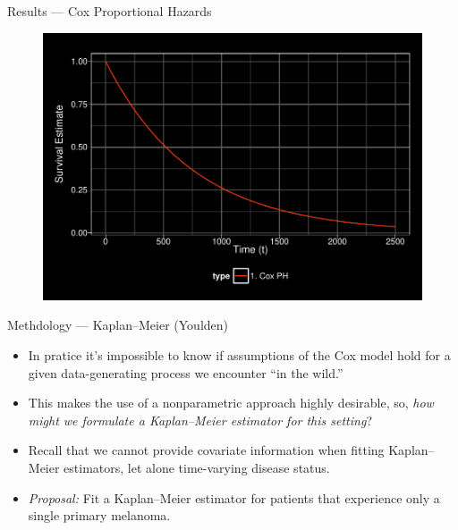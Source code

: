\documentclass[12pt,t,handout]{beamer}
\begin{document}

\begin{frame}[c]{Results --- Cox Proportional Hazards}

\begin{center}
\begin{figure}[H]
\begin{center}
\includegraphics[width=\textwidth]{Figs/s1_cox.pdf}
\end{center}
\end{figure}
\end{center}

\note{
}

\end{frame}


\begin{frame}[c]{Methdology --- Kaplan--Meier (Youlden)}

\begin{center}
\begin{itemize}
  \itemsep12pt
  \item In pratice it's impossible to know if assumptions of the Cox model hold
    for a given data-generating process we encounter ``in the wild.''
  \item This makes the use of a nonparametric approach highly desirable, so,
    \textit{how might we formulate a Kaplan--Meier estimator for this setting}?
  \item Recall that we cannot provide covariate information when fitting
    Kaplan--Meier estimators, let alone time-varying disease status.
  \item \textit{Proposal:} Fit a Kaplan--Meier estimator for patients that
    experience only a single primary melanoma.
\end{itemize}
\end{center}


\end{frame}
\end{document}
